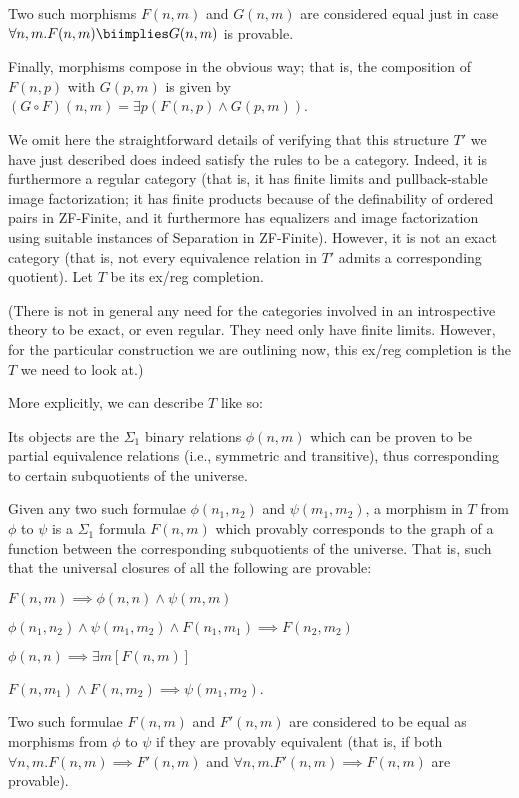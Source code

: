 Two such morphisms $F(n, m)$ and $G(n, m)$ are considered equal just in case $\forall n, m . F(n, m) \biimplies G(n, m)$ is provable. 

Finally, morphisms compose in the obvious way; that is, the composition of $F(n, p)$ with $G(p, m)$ is given by $(G \circ F)(n, m) = \exists p (F(n, p) \wedge G(p, m))$.

We omit here the straightforward details of verifying that this structure $T'$ we have just described does indeed satisfy the rules to be a category. Indeed, it is furthermore a regular category (that is, it has finite limits and pullback-stable image factorization; it has finite products because of the definability of ordered pairs in ZF-Finite, and it furthermore has equalizers and image factorization using suitable instances of Separation in ZF-Finite). However, it is not an exact category (that is, not every equivalence relation in $T'$ admits a corresponding quotient). Let $T$ be its ex/reg completion.

(There is not in general any need for the categories involved in an introspective theory to be exact, or even regular. They need only have finite limits. However, for the particular construction we are outlining now, this ex/reg completion is the $T$ we need to look at.)

More explicitly, we can describe $T$ like so:

Its objects are the $\Sigma_1$ binary relations $\phi(n, m)$ which can be proven to be partial equivalence relations (i.e., symmetric and transitive), thus corresponding to certain subquotients of the universe.

Given any two such formulae $\phi(n_1, n_2)$ and $\psi(m_1, m_2)$, a morphism in $T$ from $\phi$ to $\psi$ is a $\Sigma_1$ formula $F(n, m)$ which provably corresponds to the graph of a function between the corresponding subquotients of the universe. That is, such that the universal closures of all the following are provable:

$F(n, m) \implies \phi(n, n) \wedge \psi(m, m)$

$\phi(n_1, n_2) \wedge \psi(m_1, m_2) \wedge F(n_1, m_1) \implies F(n_2, m_2)$

$\phi(n, n) \implies \exists m [F(n, m)]$

$F(n, m_1) \wedge F(n, m_2) \implies \psi(m_1, m_2)$.

Two such formulae $F(n, m)$ and $F'(n, m)$ are considered to be equal as morphisms from $\phi$ to $\psi$ if they are provably equivalent (that is, if both $\forall n, m . F(n, m) \implies F'(n, m)$ and $\forall n, m . F'(n, m) \implies F(n, m)$ are provable).

